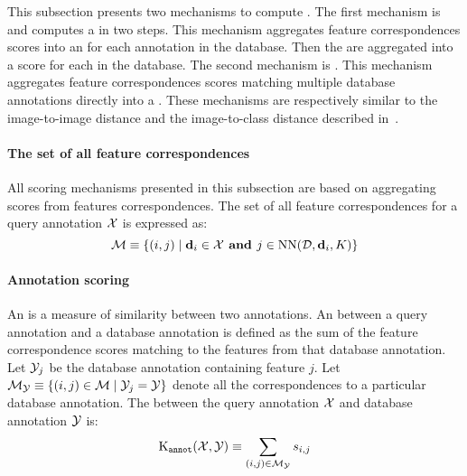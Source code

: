         This subsection presents two mechanisms to compute \namescores{}. The first mechanism is \csumprefix{} and
        computes a \namescore{} in two steps. This mechanism aggregates feature correspondences scores into an
        \annotscore{} for each annotation in the database. Then the \annotscores{} are aggregated into a score for
        each \name{} in the database. The second mechanism is \nsumprefix{}. This mechanism aggregates feature
        correspondences scores matching multiple database annotations directly into a \namescore{}. These
        mechanisms are respectively similar to the image-to-image distance and the image-to-class distance
        described in~\cite{boiman_defense_2008}.

        \paragraph{The set of all feature correspondences}
        All scoring mechanisms presented in this subsection are based on aggregating scores from features
        correspondences. The set of all feature correspondences for a query annotation $\mathcal{X}$ is expressed as:
        \begin{equation}
            \mathcal{M} \equiv \{(i, j) \mid \mathbf{d}_i \in \mathcal{X} \textbf{ and } j \in \operatorname{NN}(\mathcal{D}, \mathbf{d}_i, K)\}
        \end{equation}

        \paragraph{Annotation scoring}
            An \annotscore{} is a measure of similarity between two annotations.
            An \annotscore{} between a query annotation and a database annotation is defined as the sum of the
              feature correspondence scores matching to the features from that database annotation.
            Let $\mathcal{Y}_j$ be the database annotation containing feature $j$.
            Let
            $\mathcal{M}_{\mathcal{Y}} \equiv \left\{(i, j) \in \mathcal{M} \mid \mathcal{Y}_j = \mathcal{Y}\right\}$
            denote all the correspondences to a particular database annotation.
            The \annotscore{} between the query annotation $\mathcal{X}$ and database annotation $\mathcal{Y}$ is:
            \begin{equation}
                \operatorname{K_{\tt annot}}(\mathcal{X}, \mathcal{Y}) \equiv \sum_{(i, j) \in \mathcal{M}_{\mathcal{Y}}} s_{i, j}
            \end{equation}

